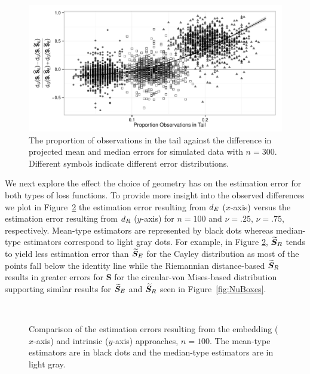 \begin{figure}[h!]
\centering
\includegraphics[width=.8\textwidth]{Nu75N300TailBehaviorStandard}
\caption{The proportion of observations in the tail against the difference in projected mean and median errors for simulated data with $n=300$.  Different symbols indicate different error distributions.}
\label{fig:SimTail}
\end{figure}

We next explore the effect the choice of geometry has on the estimation error for both types of loss functions. To provide more insight into the observed differences we plot in Figure~\ref{fig:comPL2} the estimation error resulting from ${d_E}$ ($x$-axis) versus the estimation error resulting from ${d_R}$ ($y$-axis) for $n=100$ and $\nu=.25$,  $\nu=.75$, respectively.   Mean-type estimators are represented by black dots whereas median-type estimators correspond to light gray dots. For example, in Figure \ref{fig:comPL2},  ${\widetilde{\bm S}_R}$ tends to yield less estimation error than ${\widetilde{\bm S}_E}$  for the Cayley distribution as most of the points fall below the identity line while the Riemannian distance-based ${\widetilde{\bm S}_R}$ results in greater errors for ${\bm S}$ for the circular-von Mises-based distribution supporting similar results for ${\widetilde{\bm S}_E}$ and ${\widetilde{\bm S}_R}$ seen in Figure~\ref{fig:NuBoxes}.
  

\begin{figure}[h!]
\centering
{}\\
\caption{Comparison of the estimation errors resulting from the embedding ($x$-axis) and intrinsic ($y$-axis) approaches, $n=100$.  The mean-type estimators are in black dots and the median-type estimators are in light gray.}
\label{fig:comPL2}
\end{figure}

